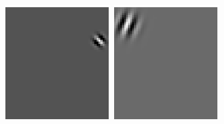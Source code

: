 \begin{figure}
\begin{center}
\includegraphics[width=\textwidth/9]{ch4/figures/Gabor5.png}
\includegraphics[width=\textwidth/9]{ch4/figures/Gabor6.png}

\end{center}
\end{figure}
